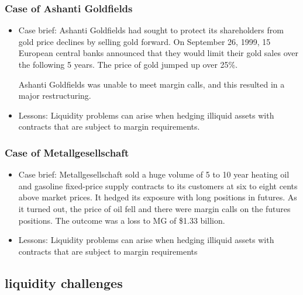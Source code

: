 \subsubsection{Case of Ashanti Goldfields}
\begin{itemize}
    \item Case brief: Ashanti Goldfields had sought to protect its shareholders from gold price declines by selling gold forward. On September 26, 1999, 15 European central banks announced that they would limit their gold sales over the following 5 years. The price of gold jumped up over 25\%.
    
    Ashanti Goldfields was unable to meet margin calls, and this resulted in a major restructuring.
    \item Lessons: Liquidity problems can arise when hedging illiquid assets with contracts that are subject to margin requirements.
\end{itemize}



\subsubsection{Case of Metallgesellschaft}
\begin{itemize}
    \item Case brief: Metallgesellschaft sold a huge volume of 5 to 10 year heating oil and gasoline fixed-price supply contracts to its customers at six to eight cents above market prices. It hedged its exposure with long positions in futures. As it turned out, the price of oil fell and there were margin calls on the futures positions. The outcome was a loss to MG of \$1.33 billion.
    \item Lessons: Liquidity problems can arise when hedging illiquid assets with contracts that are subject to margin requirements
\end{itemize}


\subsection{liquidity challenges}



